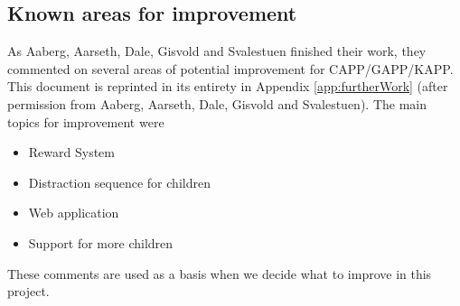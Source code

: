 \subsection{Known areas for improvement}
\label{sec:improvements}
As Aaberg, Aarseth, Dale, Gisvold and Svalestuen finished their work, they commented on several areas of potential improvement for CAPP/GAPP/KAPP. This document is reprinted in its entirety in Appendix \ref{app:furtherWork} (after permission from Aaberg, Aarseth, Dale, Gisvold and Svalestuen). The main topics for improvement were
\begin{itemize}
\item{Reward System}
\item{Distraction sequence for children}
\item{Web application}
\item{Support for more children}
\end{itemize}

These comments are used as a basis when we decide what to improve in this project. 







